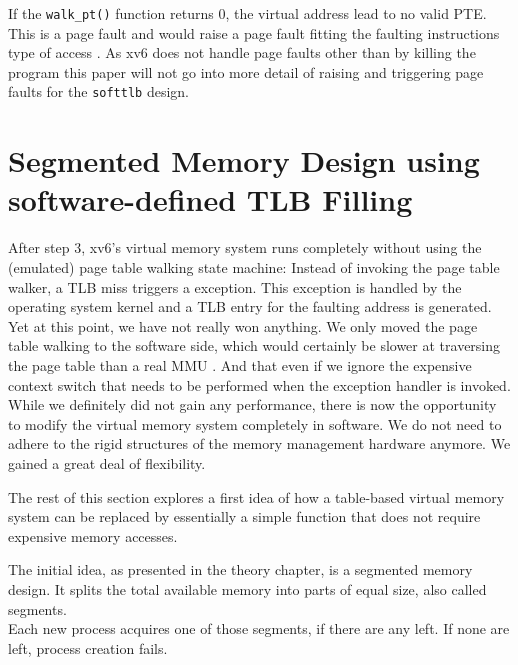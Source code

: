 
If the \texttt{walk\_pt()} function returns 0, the virtual address lead to no valid PTE. This is a
page fault and would raise a page fault fitting the faulting instructions type of access \cite{tanenbaumOS}.
As xv6 does not handle page faults other than by killing the program \cite{cox2011xv6} this
paper will not go into more detail of raising and triggering page faults for the \texttt{softtlb}
design.



\section{Segmented Memory Design using software-defined TLB Filling}

After step 3, xv6's virtual memory system runs completely without using the (emulated) page table
walking state machine:
Instead of invoking the page table walker, a TLB miss triggers a exception. This exception is handled by the
operating system kernel and a TLB entry for the faulting address is generated.\\
Yet at this point, we have not really won anything. We only moved the page table walking to the software side,
which would certainly be slower at traversing the page table than a real MMU \cite{jacob1998look}. And that
even if we ignore the expensive context switch that needs to be performed when the exception handler is invoked.\\

While we definitely did not gain any performance, there is now the opportunity to modify the virtual memory system
completely in software. We do not need to adhere to the rigid structures \cite{tanenbaumOS} of the memory management hardware anymore.
We gained a great deal of flexibility.

The rest of this section explores a first idea of how a table-based virtual memory system can be
replaced by essentially a simple function that does not require expensive memory accesses.

The initial idea, as presented in the theory chapter, is a segmented memory design. It splits the total
available memory into parts of equal size, also called segments.\\
Each new process acquires one of those segments, if there are any left. If none are left, process creation fails.

